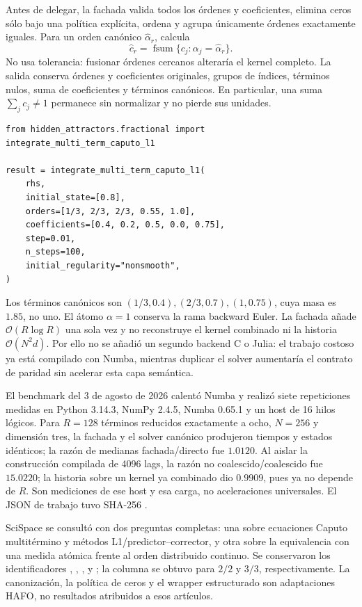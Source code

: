 Antes de delegar, la fachada valida todos los órdenes y coeficientes, elimina
ceros sólo bajo una política explícita, ordena y agrupa únicamente órdenes
 exactamente iguales. Para un orden canónico
\(\widehat\alpha_r\), calcula
\[
 \widehat c_r=\operatorname{fsum}
 \{c_j:\alpha_j=\widehat\alpha_r\}.
\]
No usa tolerancia: fusionar órdenes cercanos alteraría el kernel completo. La
salida conserva órdenes y coeficientes originales, grupos de índices, términos
nulos, suma de coeficientes y términos canónicos. En particular, una suma
\(\sum_jc_j\ne1\) permanece sin normalizar y no pierde sus unidades.

\begin{verbatim}
from hidden_attractors.fractional import integrate_multi_term_caputo_l1

result = integrate_multi_term_caputo_l1(
    rhs,
    initial_state=[0.8],
    orders=[1/3, 2/3, 2/3, 0.55, 1.0],
    coefficients=[0.4, 0.2, 0.5, 0.0, 0.75],
    step=0.01,
    n_steps=100,
    initial_regularity="nonsmooth",
)
\end{verbatim}

Los términos canónicos son
\((1/3,0.4),(2/3,0.7),(1,0.75)\), cuya masa es \(1.85\), no uno. El átomo
\(\alpha=1\) conserva la rama backward Euler. La fachada añade
\(\mathcal O(R\log R)\) una sola vez y no reconstruye el kernel combinado ni
la historia \(\mathcal O(N^2d)\). Por ello no se añadió un segundo backend C o
Julia: el trabajo costoso ya está compilado con Numba, mientras duplicar el
solver aumentaría el contrato de paridad sin acelerar esta capa semántica.

El benchmark del 3 de agosto de 2026 calentó Numba y realizó siete repeticiones
medidas en Python 3.14.3, NumPy 2.4.5, Numba 0.65.1 y un host de 16 hilos
lógicos. Para \(R=128\) términos reducidos exactamente a ocho, \(N=256\) y
dimensión tres, la fachada y el solver canónico produjeron tiempos y estados
idénticos; la razón de medianas fachada/directo fue \(1.0120\). Al aislar la
construcción compilada de 4096 lags, la razón no coalescido/coalescido fue
\(15.0220\); la historia sobre un kernel ya combinado dio \(0.9909\), pues ya
no depende de \(R\). Son mediciones de ese host y esa carga, no aceleraciones
universales. El JSON de trabajo tuvo SHA-256
.

SciSpace se consultó con dos preguntas completas: una sobre ecuaciones Caputo
multitérmino y métodos L1/predictor--corrector, y otra sobre la equivalencia con
una medida atómica frente al orden distribuido continuo. Se conservaron los
identificadores , ,
,  y
; la columna  se obtuvo para
\(2/2\) y \(3/3\), respectivamente. La canonización, la política de ceros y el
wrapper estructurado son adaptaciones HAFO, no resultados atribuidos a esos
artículos.

